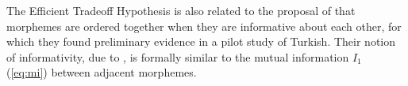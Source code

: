 \documentclass[11pt,letterpaper]{article}
\newcommand{\citep}{\parencite}
\newcommand{\citet}{\Textcite}
\newcommand\mhahn[1]{{\color{red}(#1)}}
\begin{document}

The Efficient Tradeoff Hypothesis is also related to the proposal of \citet{inkelas2016affix} that morphemes are ordered together when they are informative about each other, for which they found preliminary evidence in a pilot study of Turkish.
Their notion of informativity, due to \citep{priva2017informativity}, is formally similar to the mutual information $I_1$ (\ref{eq:mi}) between adjacent morphemes.




\end{document}
